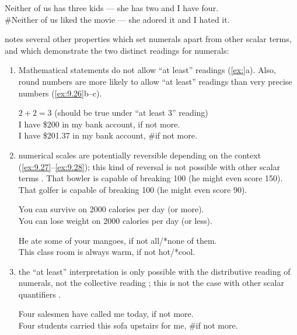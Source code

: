 \ea \label{ex:9.25}
\ea Neither of us has three kids — she has two and I have four.\\
\ex \#Neither of us liked the movie — she adored it and I hated it.
                       \z
\z


\citet{Horn1992} notes several other properties which set numerals apart from other scalar terms, and which demonstrate the two distinct readings for numerals:


\begin{enumerate}
\item Mathematical statements do not allow “at least” readings (\ref{ex:}a). Also, round numbers are more likely to allow “at least” readings than very precise numbers (\ref{ex:9.26}b--c).

\ea \label{ex:9.26}
\ea * $2+2=3$ (should be true under “at least 3” reading)\\
\ex I have \$200 in my bank account, if not more.\\
\ex I have \$201.37 in my bank account, \#if not more.
                       \z
\z
 
\item numerical scales are potentially reversible depending on the context (\ref{ex:9.27}--\ref{ex:9.28}); this kind of reversal is not possible with other scalar terms .
\ea \label{ex:9.27}
\ea That bowler is capable of breaking 100 (he might even score 150).\\
\ex That golfer is capable of breaking 100 (he might even score 90).
                       \z
\z

\ea \label{ex:9.28}
\ea You can survive on 2000 calories per day (or more).\\
\ex You can lose weight on 2000 calories per day (or less).
                       \z
\z

\ea \label{ex:9.29}
\ea He ate some of your mangoes, if not all/*none of them.\\
\ex This class room is always warm, if not hot/*cool.
                       \z
\z

\item the “at least” interpretation is only possible with the distributive reading of numerals, not the collective reading ; this is not the case with other scalar quantifiers .

\ea \label{ex:9.30}
\ea Four salesmen have called me today, if not more.\\
\ex Four students carried this sofa upstairs for me, \#if not more.
                       \z
\z


\end{enumerate}
